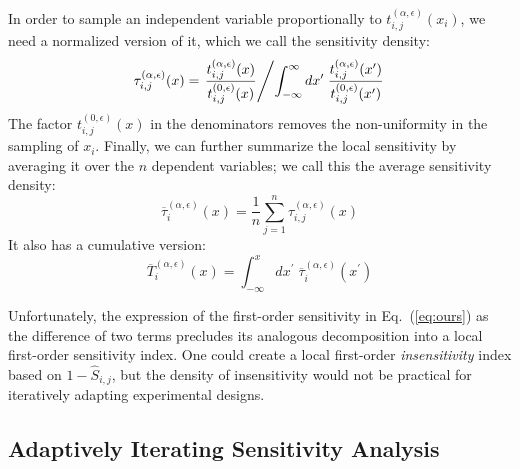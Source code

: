 \documentclass[12pt]{article}
\begin{document}
In order to sample an independent variable proportionally to $t_{i,j}^{(\alpha,\epsilon)}(x_i)$, we need a normalized version of it, which we call the sensitivity density:
\begin{equation}
    \tau_{i,j}^{(\alpha,\epsilon)}(x) = \left. \frac{t_{i,j}^{(\alpha,\epsilon)}(x)}{t_{i,j}^{(0,\epsilon)}(x)} \middle/ \int_{-\infty}^{\infty} d x^\prime \; \frac{t_{i,j}^{(\alpha,\epsilon)}(x^\prime)}{t_{i,j}^{(0,\epsilon)}(x^\prime)} \right. \label{eq:taux}
\end{equation}
The factor $t_{i,j}^{(0,\epsilon)}(x)$ in the denominators removes the non-uniformity in the sampling of $x_i$. Finally, we can further summarize the local sensitivity by averaging it over the $n$ dependent variables; we call this the average sensitivity density:
\begin{equation}
    \overline{\tau}_i^{(\alpha,\epsilon)}(x) = \frac{1}{n} \sum_{j=1}^n \tau_{i,j}^{(\alpha,\epsilon)}(x) \label{eq:taubar}
\end{equation}
It also has a cumulative version:
\begin{equation}
    \overline{T}_i^{(\alpha,\epsilon)}(x) = \int_{-\infty}^x d x^\prime \; \overline{\tau}_i^{(\alpha,\epsilon)}(x^\prime) \label{eq:tbar}
\end{equation}

Unfortunately, the expression of the first-order sensitivity in Eq.~(\ref{eq:ours}) as the difference of two terms precludes its analogous decomposition into a local first-order sensitivity index. One could create a local first-order \textit{insensitivity} index based on $1 - \hat{S}_{i,j}$, but the density of insensitivity would not be practical for iteratively adapting experimental designs.

\subsection{Adaptively Iterating Sensitivity Analysis}
\label{sec:adapt}
\end{document}
